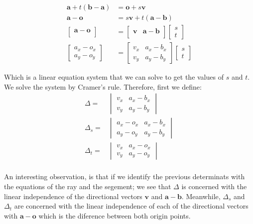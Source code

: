 \begin{align*}
\mathbf{a} + t (\mathbf{b} - \mathbf{a}) &= \mathbf{o} + s \mathbf{v} \\
\mathbf{a} - \mathbf{o} &= s \mathbf{v} + t (\mathbf{a} - \mathbf{b}) \\
\begin{bmatrix}
\mathbf{a} - \mathbf{o}  \\
 ~ 
\end{bmatrix} &= 
\begin{bmatrix}
\mathbf{v} & \mathbf{a} - \mathbf{b} \\
~ & ~
\end{bmatrix}
\begin{bmatrix}
s \\
t 
\end{bmatrix} \\
\begin{bmatrix}
a_x - o_x  \\
a_y - o_y
\end{bmatrix} &= 
\begin{bmatrix}
v_x & a_x - b_x \\
v_y & a_y - b_y
\end{bmatrix}
\begin{bmatrix}
s \\
t 
\end{bmatrix}
\end{align*}

Which is a linear equation system that we can solve to get the values of $s$ and $t$.
We solve the system by Cramer's rule. 
Therefore, first we define:
\begin{align*}
\Delta =&  
\begin{vmatrix}
v_x & a_x - b_x \\
v_y & a_y - b_y
\end{vmatrix} \\
\Delta_s =&  
\begin{vmatrix}
a_x - o_x & a_x - b_x \\
a_y - o_y & a_y - b_y
\end{vmatrix} \\
\Delta_t =&  
\begin{vmatrix}
v_x & a_x - o_x \\
v_y & a_y - o_y
\end{vmatrix} \\
\end{align*}

An interesting observation, is that if we identify the previous determinats with the equations of the ray and the segement; 
we see that $\Delta$ is  concerned with the linear independence of the directional vectors $\mathbf{v}$ and $\mathbf{a} - \mathbf{b}$.
Meanwhile, $\Delta_s$ and $\Delta_t$ are concerned with the linear independence of each of the directional vectors with $\mathbf{a} - \mathbf{o}$ which is the diference between both origin points.


